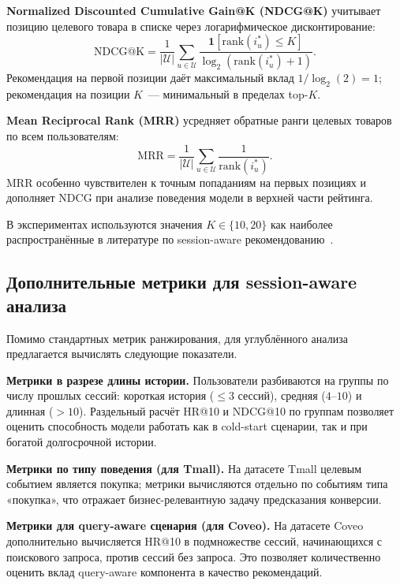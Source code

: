 \textbf{Normalized Discounted Cumulative Gain@K (NDCG@K)} учитывает позицию целевого товара в списке через логарифмическое дисконтирование:
\begin{equation}
    \mathrm{NDCG@K} = \frac{1}{|\mathcal{U}|} \sum_{u \in \mathcal{U}} \frac{\mathbf{1}\!\left[\mathrm{rank}(i^*_u) \leq K\right]}{\log_2\!\left(\mathrm{rank}(i^*_u) + 1\right)}.
\end{equation}
Рекомендация на первой позиции даёт максимальный вклад $1/\log_2(2) = 1$; рекомендация на позиции $K$~--- минимальный в пределах top-$K$.

\textbf{Mean Reciprocal Rank (MRR)} усредняет обратные ранги целевых товаров по всем пользователям:
\begin{equation}
    \mathrm{MRR} = \frac{1}{|\mathcal{U}|} \sum_{u \in \mathcal{U}} \frac{1}{\mathrm{rank}(i^*_u)}.
\end{equation}
MRR особенно чувствителен к точным попаданиям на первых позициях и дополняет NDCG при анализе поведения модели в верхней части рейтинга.

В экспериментах используются значения $K \in \{10, 20\}$ как наиболее распространённые в литературе по session-aware рекомендованию~\cite{kang2018sasrec, sun2019bert4rec, qiu2022duorec, shin2024bsarec}.

\subsection{Дополнительные метрики для session-aware анализа}
\label{subsec:ch1:extended_metrics}

Помимо стандартных метрик ранжирования, для углублённого анализа предлагается вычислять следующие показатели.

\textbf{Метрики в разрезе длины истории.} Пользователи разбиваются на группы по числу прошлых сессий: короткая история ($\leq 3$ сессий), средняя ($4$--$10$) и длинная ($> 10$). Раздельный расчёт HR@10 и NDCG@10 по группам позволяет оценить способность модели работать как в cold-start сценарии, так и при богатой долгосрочной истории.

\textbf{Метрики по типу поведения (для Tmall).} На датасете Tmall целевым событием является покупка; метрики вычисляются отдельно по событиям типа «покупка», что отражает бизнес-релевантную задачу предсказания конверсии.

\textbf{Метрики для query-aware сценария (для Coveo).} На датасете Coveo дополнительно вычисляется HR@10 в подмножестве сессий, начинающихся с поискового запроса, против сессий без запроса. Это позволяет количественно оценить вклад query-aware компонента в качество рекомендаций.

